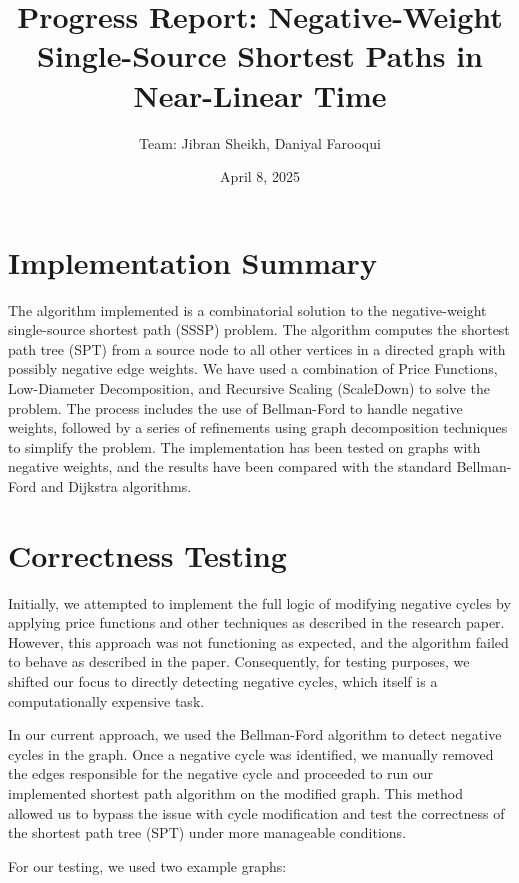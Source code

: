 \documentclass{article}
\begin{document}
\title{Progress Report: Negative-Weight Single-Source Shortest Paths in Near-Linear Time}
\author{Team: Jibran Sheikh, Daniyal Farooqui}
\date{April 8, 2025}
\maketitle

\section{Implementation Summary}
\label{sec:implementation_summary}
The algorithm implemented is a combinatorial solution to the negative-weight single-source shortest path (SSSP) problem. The algorithm computes the shortest path tree (SPT) from a source node to all other vertices in a directed graph with possibly negative edge weights. We have used a combination of Price Functions, Low-Diameter Decomposition, and Recursive Scaling (ScaleDown) to solve the problem. The process includes the use of Bellman-Ford to handle negative weights, followed by a series of refinements using graph decomposition techniques to simplify the problem. The implementation has been tested on graphs with negative weights, and the results have been compared with the standard Bellman-Ford and Dijkstra algorithms.

\section{Correctness Testing}
Initially, we attempted to implement the full logic of modifying negative cycles by applying price functions and other techniques as described in the research paper. However, this approach was not functioning as expected, and the algorithm failed to behave as described in the paper. Consequently, for testing purposes, we shifted our focus to directly detecting negative cycles, which itself is a computationally expensive task.

In our current approach, we used the Bellman-Ford algorithm to detect negative cycles in the graph. Once a negative cycle was identified, we manually removed the edges responsible for the negative cycle and proceeded to run our implemented shortest path algorithm on the modified graph. This method allowed us to bypass the issue with cycle modification and test the correctness of the shortest path tree (SPT) under more manageable conditions.

For our testing, we used two example graphs:
\end{document}
